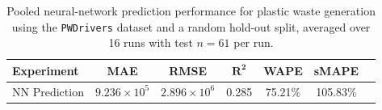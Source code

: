 \begin{table}[!ht]
	\centering
	\caption{\centering Pooled neural-network prediction performance for plastic waste generation using the \texttt{PWDrivers} dataset and a random hold-out split, averaged over 16 runs with test \(n=61\) per run.}
	\begin{tabular}{@{}lcccccc@{}}
		\toprule
		\textbf{Experiment} & \textbf{MAE}          & \textbf{RMSE}         & $\mathbf{R^2}$ & \textbf{WAPE} & \textbf{sMAPE} \\
		\midrule
		NN Prediction       & \(9.236 \times 10^5\) & \(2.896 \times 10^6\) & 0.285          & 75.21\%       & 105.83\%       \\
		\hline
	\end{tabular}
	\label{tab:nn_forecasting_metrics}
\end{table}
